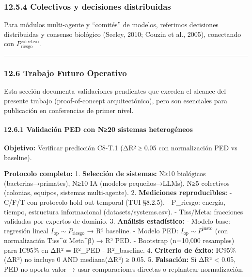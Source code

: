 \subsubsection{12.5.4 Colectivos y decisiones
distribuidas}\label{colectivos-y-decisiones-distribuidas}

Para módulos multi-agente y ``comités'' de modelos, referimos decisiones
distribuidas y consenso biológico (Seeley, 2010; Couzin et al., 2005),
conectando con \(P_{\text{riesgo}}^{\text{colectivo}}\).

\begin{center}\rule{0.5\linewidth}{0.5pt}\end{center}

\subsubsection{12.6 Trabajo Futuro
Operativo}\label{trabajo-futuro-operativo}

Esta sección documenta validaciones pendientes que exceden el alcance
del presente trabajo (proof-of-concept arquitectónico), pero son
esenciales para publicación en conferencias de primer nivel.

\paragraph{12.6.1 Validación PED con N≥20 sistemas
heterogéneos}\label{validaciuxf3n-ped-con-n20-sistemas-heteroguxe9neos}

\textbf{Objetivo:} Verificar predicción C8-T.1 (ΔR² ≥ 0.05 con
normalización PED vs baseline).

\textbf{Protocolo completo:} 1. \textbf{Selección de sistemas:} N≥10
biológicos (bacterias→primates), N≥10 IA (modelos pequeños→LLMs), N≥5
colectivos (colonias, equipos, sistemas multi-agente). 2.
\textbf{Mediciones reproducibles:} - C/F/T con protocolo hold-out
temporal (TUI §8.2.5). - P\_riesgo: energía, tiempo, estructura
informacional (datasets/systems.csv). - Tiss/Meta: fracciones validadas
por expertos de dominio. 3. \textbf{Análisis estadístico:} - Modelo
base: regresión lineal \(I_{\text{op}} \sim P_{\text{riesgo}}\) → R²
baseline. - Modelo PED: \(I_{\text{op}} \sim P^{\text{justo}}\) (con
normalización Tiss\^{}α Meta\^{}β) → R² PED. - Bootstrap (n=10,000
resamples) para IC95\% en ΔR² = R²\_PED - R²\_baseline. 4.
\textbf{Criterio de éxito:} IC95\%(ΔR²) no incluye 0 AND mediana(ΔR²) ≥
0.05. 5. \textbf{Falsación:} Si ΔR² \textless{} 0.05, PED no aporta
valor → usar comparaciones directas o replantear normalización.


